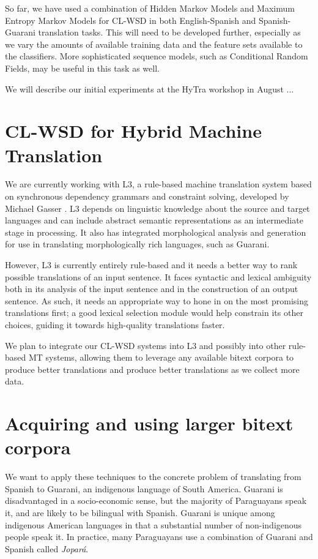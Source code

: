 \documentclass{article}
\begin{document}
So far, we have used a combination of Hidden Markov Models and Maximum Entropy
Markov Models for CL-WSD in both English-Spanish and Spanish-Guarani
translation tasks. This will need to be developed further, especially as we
vary the amounts of available training data and the feature sets available to
the classifiers. More sophisticated sequence models, such as Conditional Random
Fields, may be useful in this task as well.

We will describe our initial experiments at the HyTra workshop in August
\cite{rudnick-gasser:2013:HyTra-2013} ...

\section{CL-WSD for Hybrid Machine Translation}
We are currently working with L3, a rule-based machine translation system based
on synchronous dependency grammars and constraint solving, developed by Michael
Gasser . L3 depends on linguistic
knowledge about the source and target languages and can include abstract
semantic representations as an intermediate stage in processing. It also has
integrated morphological analysis and generation for use in translating
morphologically rich languages, such as Guarani.

However, L3 is currently entirely rule-based and it needs a better way to rank
possible translations of an input sentence. It faces syntactic and lexical
ambiguity both in its analysis of the input sentence and in the construction of
an output sentence. As such, it needs an appropriate way to hone in on the most
promising translations first; a good lexical selection module would help
constrain its other choices, guiding it towards high-quality translations
faster.

We plan to integrate our CL-WSD systems into L3 and possibly into other
rule-based MT systems, allowing them to leverage any available bitext corpora
to produce better translations and produce better translations as we collect
more data.

\section{Acquiring and using larger bitext corpora}
We want to apply these techniques to the concrete problem of translating from
Spanish to Guarani, an indigenous language of South America. Guarani is
disadvantaged in a socio-economic sense, but the majority of Paraguayans speak
it, and are likely to be bilingual with Spanish. Guarani is unique among
indigenous American languages in that a substantial number of non-indigenous
people speak it. In practice, many Paraguayans use a combination of Guarani and
Spanish called \emph{Jopar{\'a}}.
\end{document}
